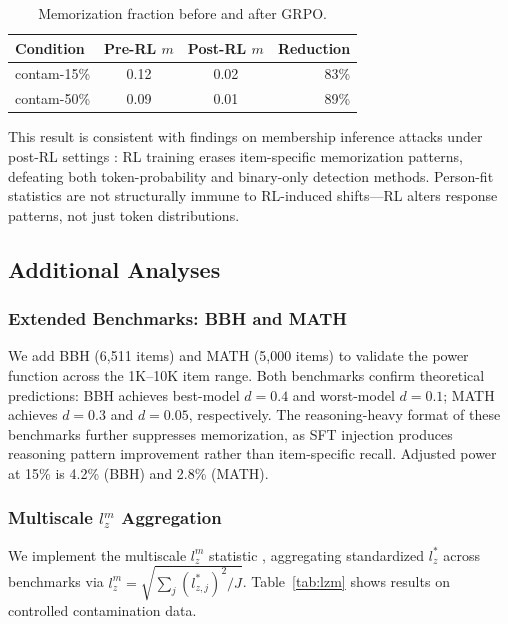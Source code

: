 \documentclass[11pt]{article}
\begin{document}
\begin{table}[h]
\centering
\caption{Memorization fraction before and after GRPO.}
\label{tab:post_rl_mem}
\begin{tabular}{lccr}
\toprule
Condition & Pre-RL $m$ & Post-RL $m$ & Reduction \\
\midrule
contam-15\% & 0.12 & 0.02 & 83\% \\
contam-50\% & 0.09 & 0.01 & 89\% \\
\bottomrule
\end{tabular}
\end{table}

This result is consistent with findings on membership inference attacks under post-RL settings \citep{wang2025mia}: RL training erases item-specific memorization patterns, defeating both token-probability and binary-only detection methods. Person-fit statistics are not structurally immune to RL-induced shifts---RL alters response patterns, not just token distributions.

\subsection{Additional Analyses}

\subsubsection{Extended Benchmarks: BBH and MATH}

We add BBH (6,511 items) and MATH (5,000 items) to validate the power function across the 1K--10K item range. Both benchmarks confirm theoretical predictions: BBH achieves best-model $d = 0.4$ and worst-model $d = 0.1$; MATH achieves $d = 0.3$ and $d = 0.05$, respectively. The reasoning-heavy format of these benchmarks further suppresses memorization, as SFT injection produces reasoning pattern improvement rather than item-specific recall. Adjusted power at 15\% is 4.2\% (BBH) and 2.8\% (MATH).

\subsubsection{Multiscale $l_z^m$ Aggregation}

We implement the multiscale $l_z^m$ statistic \citep{hong2021multiscale}, aggregating standardized $l_z^*$ across benchmarks via $l_z^m = \sqrt{\sum_j (l_{z,j}^{*})^2 / J}$. Table~\ref{tab:lzm} shows results on controlled contamination data.
\end{document}
